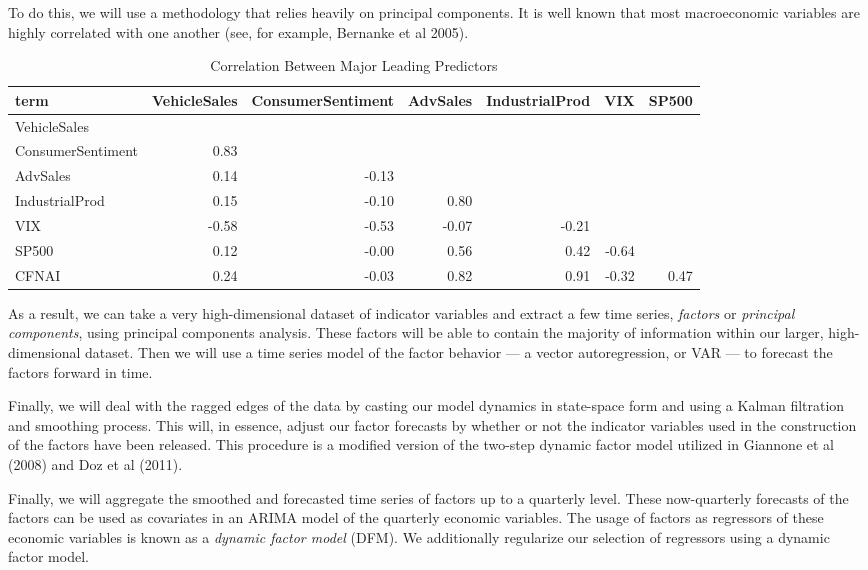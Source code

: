 \documentclass[11pt, letterpaper]{article}\usepackage[]{graphicx}\usepackage[]{color}
\begin{document}
To do this, we will use a methodology that relies heavily on principal components. It is well known that most macroeconomic variables are highly correlated with one another (see, for example, Bernanke et al 2005).
\begin{table}[H]
\centering
\begingroup\scriptsize
\begin{tabular}{lrrrrrr}
  \hline
term & VehicleSales & ConsumerSentiment & AdvSales & IndustrialProd & VIX & SP500 \\ 
  \hline
VehicleSales &  &  &  &  &  &  \\ 
  ConsumerSentiment & 0.83 &  &  &  &  &  \\ 
  AdvSales & 0.14 & -0.13 &  &  &  &  \\ 
  IndustrialProd & 0.15 & -0.10 & 0.80 &  &  &  \\ 
  VIX & -0.58 & -0.53 & -0.07 & -0.21 &  &  \\ 
  SP500 & 0.12 & -0.00 & 0.56 & 0.42 & -0.64 &  \\ 
  CFNAI & 0.24 & -0.03 & 0.82 & 0.91 & -0.32 & 0.47 \\ 
   \hline
\end{tabular}
\endgroup
\caption{Correlation Between Major Leading Predictors} 
\end{table}

As a result, we can take a very high-dimensional dataset of indicator variables and extract a few time series, \textit{factors} or \textit{principal components}, using principal components analysis. These factors will be able to contain the majority of information within our larger, high-dimensional dataset. Then we will use a time series model of the factor behavior --- a vector autoregression, or VAR --- to forecast the factors forward in time. 

Finally, we will deal with the ragged edges of the data by casting our model dynamics in state-space form and using a Kalman filtration and smoothing process. This will, in essence, adjust our factor forecasts by whether or not the indicator variables used in the construction of the factors have been released. This procedure is a modified version of the two-step dynamic factor model utilized in Giannone et al (2008) and Doz et al (2011).

Finally, we will aggregate the smoothed and forecasted time series of factors up to a quarterly level. These now-quarterly forecasts of the factors can be used as covariates in an ARIMA model of the quarterly economic variables. The usage of factors as regressors of these economic variables is known as a \textit{dynamic factor model} (DFM). We additionally regularize our selection of regressors using a dynamic factor model.
\end{document}
